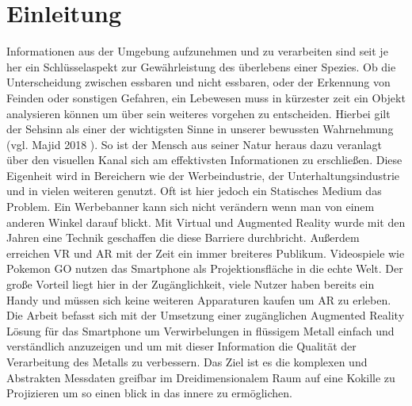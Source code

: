 \section{Einleitung}
Informationen aus der Umgebung aufzunehmen und zu verarbeiten sind seit je her ein Schlüsselaspekt zur Gewährleistung des überlebens einer Spezies. Ob die Unterscheidung zwischen essbaren und nicht essbaren, oder der Erkennung von Feinden oder sonstigen Gefahren, ein Lebewesen muss in kürzester zeit ein Objekt analysieren können um über sein weiteres vorgehen zu entscheiden. \newline
Hierbei gilt der Sehsinn als einer der wichtigsten Sinne in unserer bewussten Wahrnehmung (vgl. Majid 2018 \cite{Majid11369}). So ist der Mensch aus seiner Natur heraus dazu veranlagt über den visuellen Kanal sich am effektivsten Informationen zu erschließen. Diese Eigenheit wird in Bereichern wie der Werbeindustrie, der Unterhaltungsindustrie und in vielen weiteren genutzt. Oft ist hier jedoch ein Statisches Medium das Problem. Ein Werbebanner kann sich nicht verändern wenn man von einem anderen Winkel darauf blickt. Mit Virtual und Augmented Reality wurde mit den Jahren eine Technik geschaffen die diese Barriere durchbricht. Außerdem erreichen VR und AR mit der Zeit ein immer breiteres Publikum. Videospiele wie Pokemon GO nutzen das Smartphone als Projektionsfläche in die echte Welt. Der große Vorteil liegt hier in der Zugänglichkeit, viele Nutzer haben bereits ein Handy und müssen sich keine weiteren Apparaturen kaufen um AR zu erleben.\newline
Die Arbeit befasst sich mit der Umsetzung einer zugänglichen Augmented Reality Lösung für das Smartphone um Verwirbelungen in flüssigem Metall einfach und verständlich anzuzeigen und um mit dieser Information
die Qualität der Verarbeitung des Metalls zu verbessern. Das Ziel ist es die komplexen und Abstrakten Messdaten greifbar im Dreidimensionalem Raum auf eine Kokille zu Projizieren um so einen blick in das innere zu ermöglichen.